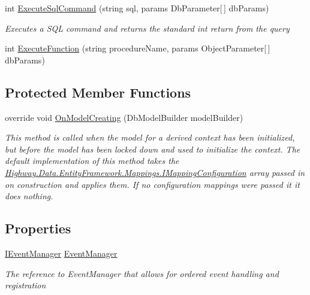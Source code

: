 \begin{DoxyCompactItemize}
int \hyperlink{class_highway_1_1_data_1_1_entity_framework_1_1_contexts_1_1_entity_framework_context_aec1f83731440a4f42b83458101020819}{Execute\-Sql\-Command} (string sql, params Db\-Parameter\mbox{[}$\,$\mbox{]} db\-Params)
\begin{DoxyCompactList}\small\item\em Executes a S\-Q\-L command and returns the standard int return from the query \end{DoxyCompactList}\item 
int \hyperlink{class_highway_1_1_data_1_1_entity_framework_1_1_contexts_1_1_entity_framework_context_aba2419c2ed299ff633303a50584d059d}{Execute\-Function} (string procedure\-Name, params Object\-Parameter\mbox{[}$\,$\mbox{]} db\-Params)
\begin{DoxyCompactList}\small\item\em \end{DoxyCompactList}\end{DoxyCompactItemize}
\subsection*{Protected Member Functions}
\begin{DoxyCompactItemize}
\item 
override void \hyperlink{class_highway_1_1_data_1_1_entity_framework_1_1_contexts_1_1_entity_framework_context_aaf3b39746258acf1cc5e14467c5e795d}{On\-Model\-Creating} (Db\-Model\-Builder model\-Builder)
\begin{DoxyCompactList}\small\item\em This method is called when the model for a derived context has been initialized, but before the model has been locked down and used to initialize the context. The default implementation of this method takes the \hyperlink{interface_highway_1_1_data_1_1_entity_framework_1_1_mappings_1_1_i_mapping_configuration}{Highway.\-Data.\-Entity\-Framework.\-Mappings.\-I\-Mapping\-Configuration} array passed in on construction and applies them. If no configuration mappings were passed it it does nothing. \end{DoxyCompactList}\end{DoxyCompactItemize}
\subsection*{Properties}
\begin{DoxyCompactItemize}
\item 
\hyperlink{interface_highway_1_1_data_1_1_interfaces_1_1_i_event_manager}{I\-Event\-Manager} \hyperlink{class_highway_1_1_data_1_1_entity_framework_1_1_contexts_1_1_entity_framework_context_aefd1b923c2414387cddd0a579608039d}{Event\-Manager}
\begin{DoxyCompactList}\small\item\em The reference to Event\-Manager that allows for ordered event handling and registration \end{DoxyCompactList}\end{DoxyCompactItemize}
